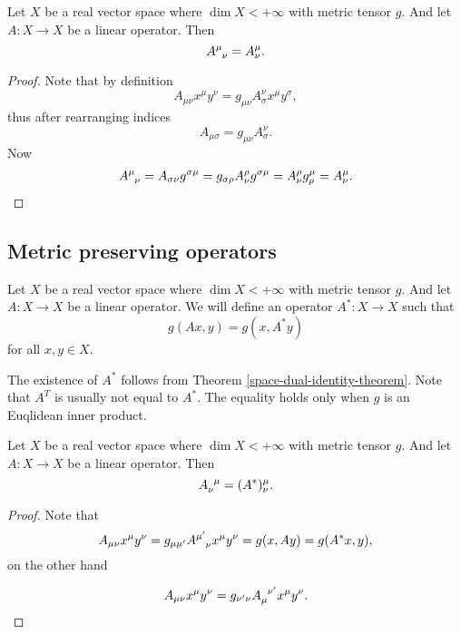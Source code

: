 \documentclass[main.tex]{subfiles}
\begin{document}
\begin{theorem}
Let $X$ be a real vector space where $\dim X < +\infty$ with metric tensor $g$. And let $A:X\to X$ be a linear operator. Then
\begin{equation}
\tensor{A}{^\mu_\nu} = A^\mu_\nu.
\end{equation}
\end{theorem}
\begin{proof}
Note that by definition
\begin{equation}
A_{\mu\nu} x^\mu y^\nu = g_{\mu\nu} A^\nu_\sigma x^\mu y^\sigma,
\end{equation}
thus after rearranging indices
\begin{equation}
A_{\mu\sigma} = g_{\mu \nu} A^\nu_\sigma.
\end{equation}
Now
\begin{align}
\tensor{A}{^\mu_\nu} = A_{\sigma\nu}g^{\sigma\mu} = g_{\sigma \rho} A^\rho_\nu g^{\sigma\mu} = A^\rho_\nu g^\mu_\rho = A^\mu_\nu.
\end{align}
\end{proof}

\subsection{Metric preserving operators}
\label{metric-preserving-operators}

\begin{definition}
Let $X$ be a real vector space where $\dim X < +\infty$ with metric tensor $g$. And let $A:X\to X$ be a linear operator. We will define an operator $A^*: X \to X$ such that
\begin{equation}
g(Ax, y) = g(x, A^*y)
\end{equation}
for all $x, y\in X$.
\end{definition}

The existence of $A^*$ follows from Theorem \ref{space-dual-identity-theorem}.
Note that $A^T$ is usually not equal to $A^*$. The equality holds only when $g$ is an Euqlidean inner product.

\begin{theorem}
Let $X$ be a real vector space where $\dim X < +\infty$ with metric tensor $g$. And let $A:X\to X$ be a linear operator. Then
\begin{equation}
\tensor{A}{_\nu^\mu} = (A^*)^\mu_\nu.
\end{equation}
\end{theorem}
\begin{proof}
Note that 
\begin{equation}
A_{\mu\nu} x^\mu y^\nu = g_{\mu\mu'} \tensor{A}{^{\mu'}_{\nu}} x^\mu y^\nu = g(x, Ay) = g(A^*x, y),
\end{equation}
on the other hand

\begin{equation}
A_{\mu\nu} x^\mu y^\nu = g_{\nu'\nu} \tensor{A}{_\mu^{\nu'}} x^\mu y^\nu.
\end{equation}

\end{proof}
\end{document}
